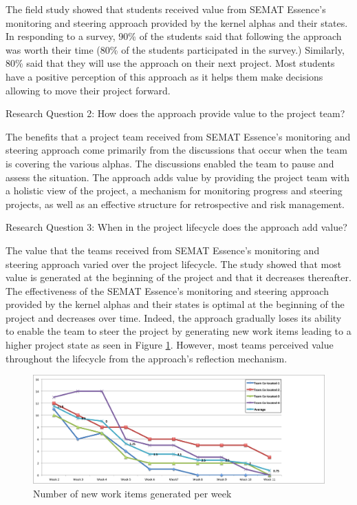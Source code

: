 \documentclass[preprint,12pt,3p]{elsarticle}
\begin{document}
The field study showed that students received value from SEMAT Essence’s monitoring and steering approach provided by the kernel alphas and their states. In responding to a survey, 90\% of the students said that following the approach was worth their time (80\% of the students participated in the survey.) Similarly, 80\% said that they will use the approach on their next project. Most students have a positive perception of this approach as it helps them make decisions allowing to move their project forward.

Research Question 2: How does the approach provide value to the project team?

The benefits that a project team received from SEMAT Essence’s monitoring and steering approach come primarily from the discussions that occur when the team is covering the various alphas. The discussions enabled the team to pause and assess the situation. The approach adds value by providing the project team with a holistic view of the project, a mechanism for monitoring progress and steering projects, as well as an effective structure for retrospective and risk management. %

Research Question 3: When in the project lifecycle does the approach add value?

The value that the teams received from SEMAT Essence’s monitoring and steering approach varied over the project lifecycle. The study showed that most value is generated at the beginning of the project and that it decreases thereafter. The effectiveness of the SEMAT Essence’s monitoring and steering approach provided by the kernel alphas and their states is optimal at the beginning of the project and
decreases over time. Indeed, the approach gradually loses its ability to enable the team to steer the project by generating new work items leading to a higher project state as seen in Figure \ref{WorkItems}. However, most teams perceived value throughout the lifecycle from the approach's reflection mechanism.

\begin{figure}[h]\vspace*{4pt}
\centerline{\includegraphics[width=5.4in]{field_study_images/WorkItems}}
\caption{Number of new work items generated per week}\vspace*{-6pt}\label{WorkItems}
\end{figure}
\end{document}
